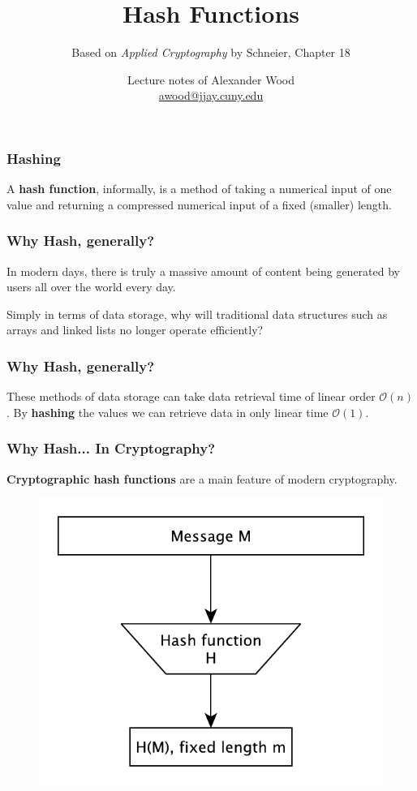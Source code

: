 \documentclass{beamer}
\title[HF]{Hash Functions}
\subtitle{Based on \emph{Applied Cryptography} by Schneier, Chapter 18}
\author
{Lecture notes of Alexander Wood \\ \scriptsize \href{mailto:awood@jjay.cuny.edu}{awood@jjay.cuny.edu}}
\institute[JJay]{John Jay College of Criminal Justice}
\date{}
\newcommand{\<}{\langle}
\renewcommand{\>}{\rangle}
\begin{document}

\begin{frame}
  \titlepage
\end{frame}

\begin{frame}
\frametitle{Hashing}

A \textbf{hash function}, informally, is a method of taking a numerical input of one value and returning a compressed numerical input of a fixed (smaller) length. 
\end{frame}

\begin{frame}
\frametitle{Why Hash, generally?}

In modern days, there is truly a massive amount of content being generated by users all over the world every day.\newline

Simply in terms of data storage, why will traditional data structures such as arrays and linked lists no longer operate efficiently?
\end{frame}

\begin{frame}
\frametitle{Why Hash, generally?}

These methods of data storage can take data retrieval time of linear order $\mathcal O(n)$. By \textbf{hashing} the values we can retrieve data in only linear time $\mathcal O (1)$.
\end{frame}


\begin{frame}
\frametitle{Why Hash... In Cryptography?}

\textbf{Cryptographic hash functions} are a main feature of modern cryptography. 
\begin{figure}
\includegraphics[scale=.6]{IMG/hash.pdf}
\end{figure}
\end{frame}
\end{document}
